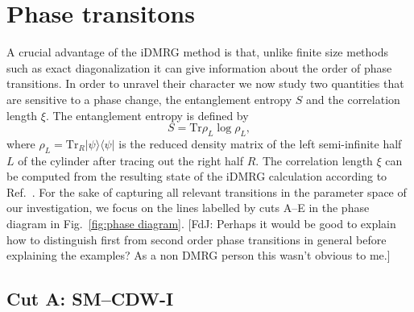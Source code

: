 \documentclass[aps,prx,10pt,twocolumn,floatfix,superscriptaddress,showpacs,numerical,footinbib]{revtex4-1}
\newcommand{\ket}[1]{| #1 \rangle}
\newcommand{\bra}[1]{\langle #1 |}
\newcommand{\noteFdJ}[1]{{\color{cyan} [FdJ: #1]}}
\begin{document}
\section{\label{sec:phasetransitions} Phase transitons}
%
A crucial advantage of the iDMRG method is that, unlike finite
size methods such as exact diagonalization it can give information about the order of phase transitions.
%
In order to unravel their character we now study two quantities that are sensitive
to a phase change, the entanglement entropy $S$ and the correlation length $\xi$.
%
The entanglement entropy is defined by
%
\begin{equation}
 S = \mathrm{Tr} \rho_L \log \rho_L,
\end{equation}
%
where $\rho_L = \mathrm{Tr}_R \ket{\psi}\bra{\psi}$ is the reduced density matrix of the left semi-infinite half $L$ of the cylinder after tracing out the right half $R$.
%
The correlation length $\xi$ can be computed from the resulting state of the iDMRG calculation according to Ref.~\cite{KZM13}.
%
For the sake of capturing all relevant transitions in the parameter space of our investigation, we focus on the lines labelled by cuts A--E in the phase diagram in Fig.~\ref{fig:phase diagram}.
%
\noteFdJ{Perhaps it would be good to explain how to distinguish first from second order phase transitions in general before explaining the examples? As a non DMRG person this wasn't obvious to me.}

\subsection{Cut A: SM--CDW-I}
\end{document}
